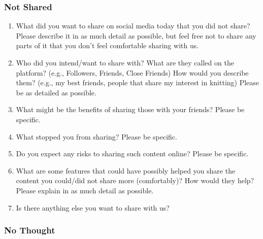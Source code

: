 \subsubsection*{Not Shared}

\begin{enumerate}
    \item What did you want to share on social media today that you did not share? Please describe it in as much detail as possible, but feel free not to share any parts of it that you don’t feel comfortable sharing with us.

    \item Who did you intend/want to share with? What are they called on the platform? (e.g., Followers, Friends, Close Friends) How would you describe them? (e.g., my best friends, people that share my interest in knitting) Please be as detailed as possible.

    \item What might be the benefits of sharing those with your friends? Please be specific.

    \item What stopped you from sharing? Please be specific.

    \item Do you expect any risks to sharing such content online? Please be specific.

    \item What are some features that could have possibly helped you share the content you could/did not share more (comfortably)? How would they help? Please explain in as much detail as possible.

    \item Is there anything else you want to share with us?
\end{enumerate}

\subsubsection*{No Thought}

